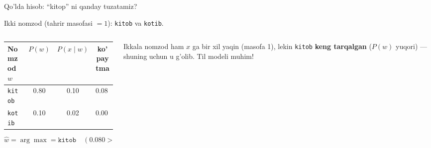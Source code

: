 \documentclass[aspectratio=169,11pt]{beamer}
\begin{document}
\begin{frame}{Qo'lda hisob: ``kitop'' ni qanday tuzatamiz?}
  \begin{tcolorbox}[defbox,title=Kuzatilgan xato: x = ``kitop'']
    \small
    Ikki nomzod (tahrir masofasi $=1$): \texttt{kitob} va \texttt{kotib}.
  \end{tcolorbox}
  \vspace{0.2em}
  \begin{columns}[T]
    \begin{column}{0.54\textwidth}
      \small
      \begin{tabular}{lccc}
        \toprule
        Nomzod $w$ & $P(w)$ & $P(x{\mid}w)$ & ko'paytma \\
        \midrule
        \texttt{kitob} & 0.80 & 0.10 & $\mathbf{0.080}$ \\
        \texttt{kotib} & 0.10 & 0.02 & $0.002$ \\
        \bottomrule
      \end{tabular}
      \vspace{6pt}
      $$ \hat{w} = \arg\max = \texttt{kitob} \quad (0.080 > 0.002) $$
    \end{column}
    \begin{column}{0.42\textwidth}
      \begin{tcolorbox}[okbox,top=2pt,bottom=2pt]
        \footnotesize
        Ikkala nomzod ham $x$ ga bir xil yaqin (masofa 1), lekin
        \texttt{kitob} \textbf{keng tarqalgan} ($P(w)$ yuqori) ---
        shuning uchun u g'olib. Til modeli muhim!
      \end{tcolorbox}
    \end{column}
  \end{columns}
\end{frame}
\end{document}
